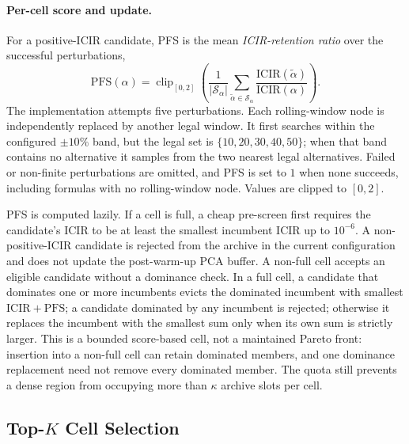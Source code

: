 \paragraph{Per-cell score and update.} For a positive-ICIR candidate, PFS is the mean \emph{ICIR-retention ratio} over the successful perturbations,
\[
\mathrm{PFS}(\alpha)=\operatorname{clip}_{[0,2]}\!\left(\frac{1}{|\mathcal S_\alpha|}\sum_{\widetilde\alpha\in\mathcal S_\alpha}\frac{\mathrm{ICIR}(\widetilde\alpha)}{\mathrm{ICIR}(\alpha)}\right).
\]
The implementation attempts five perturbations. Each rolling-window node is independently replaced by another legal window. It first searches within the configured $\pm10\%$ band, but the legal set is $\{10,20,30,40,50\}$; when that band contains no alternative it samples from the two nearest legal alternatives. Failed or non-finite perturbations are omitted, and PFS is set to $1$ when none succeeds, including formulas with no rolling-window node. Values are clipped to $[0,2]$.

PFS is computed lazily. If a cell is full, a cheap pre-screen first requires the candidate's ICIR to be at least the smallest incumbent ICIR up to $10^{-6}$. A non-positive-ICIR candidate is rejected from the archive in the current configuration and does not update the post-warm-up PCA buffer. A non-full cell accepts an eligible candidate without a dominance check. In a full cell, a candidate that dominates one or more incumbents evicts the dominated incumbent with smallest $\mathrm{ICIR}+\mathrm{PFS}$; a candidate dominated by any incumbent is rejected; otherwise it replaces the incumbent with the smallest sum only when its own sum is strictly larger. This is a bounded score-based cell, not a maintained Pareto front: insertion into a non-full cell can retain dominated members, and one dominance replacement need not remove every dominated member. The quota still prevents a dense region from occupying more than $\kappa$ archive slots per cell.

\subsection{\texorpdfstring{Top-$K$ Cell Selection}{Top-K Cell Selection}}
\label{sec:alphaqd_export}

